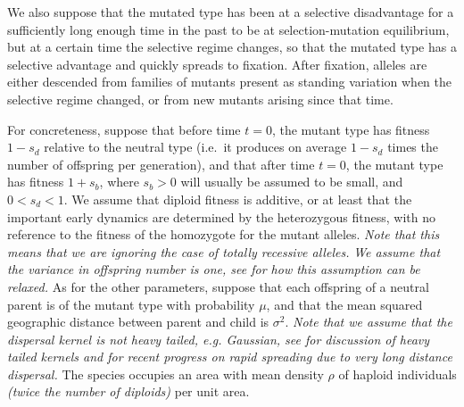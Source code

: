 \documentclass{article}
\newcommand{\gc}[1]{{\it\color{blue} #1} }
\newcommand{\mfp}[1]{{\it\color{red} #1} }
\begin{document}
We also suppose that 
the mutated type has been at a selective disadvantage 
for a sufficiently long enough time in the past to be at selection-mutation equilibrium,
but at a certain time the selective regime changes, so that the mutated type has a selective advantage and quickly spreads to fixation.
After fixation, alleles are either descended
from families of mutants present as standing variation when the selective regime changed,
or from new mutants arising since that time.

For concreteness, suppose that before time $t=0$,
the mutant type has fitness $1-s_d$ relative to the neutral type
(i.e.\ it produces on average $1-s_d$ times the number of offspring per generation),
and that after time $t=0$,
the mutant type has fitness $1+s_b$,
where $s_b>0$ will usually be assumed to be small, and $0<s_d<1$.
We assume that diploid fitness is additive, or at least that the
important early dynamics are determined by the heterozygous fitness, with no reference to the fitness of the
homozygote for the mutant alleles. \mfp{Note that this means that we
  are ignoring the case of totally recessive alleles.}
\gc{We assume that the variance in offspring number is one, see
  \cite{ralphcoop2010} for how this assumption can be relaxed.}
As for the other parameters,
suppose that each offspring of a neutral parent is of the mutant type with probability $\mu$,
and that the mean squared geographic distance between parent and child
is $\sigma^2$. \mfp{Note that we assume that the dispersal kernel is
  not heavy tailed, e.g. Gaussian, see \citet{ralphcoop2010} for
  discussion of heavy tailed kernels and \citet{hallatschek_acceleration_2014} for recent progress
  on rapid spreading due to very long distance dispersal.}
The species occupies an area with mean density
$\rho$ of haploid individuals \gc{(twice the number of diploids)} per unit area.


\end{document}
